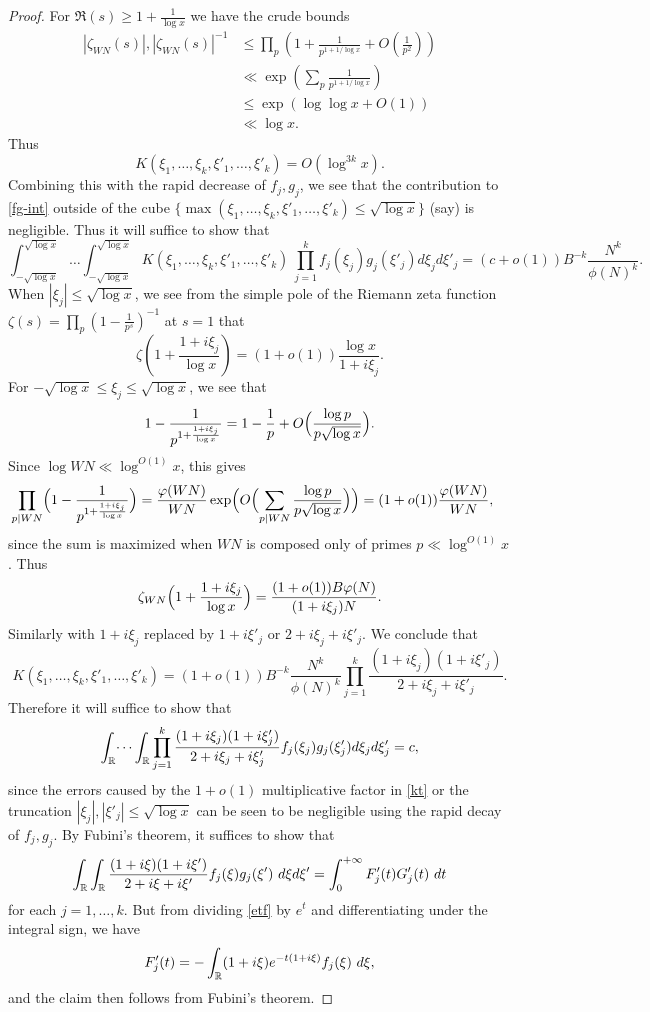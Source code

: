 \begin{proof}
For $\Re(s) \geq 1 + \frac{1}{\log x}$ we have the crude bounds
\begin{align*}
 |\zeta_{W N}(s)|, |\zeta_{W N}(s)|^{-1} &\leq \prod_p \left(1 + \frac{1}{p^{1+1/\log x}} + O\left(\frac{1}{p^2}\right)\right)\\
&\ll \exp\left( \sum_p \frac{1}{p^{1+1/\log x}} \right) \\
&\leq \exp( \log\log x + O(1) ) \\
&\ll \log x.
\end{align*}
Thus
$$
 K(\xi_1,\dots,\xi_k,\xi'_1,\dots,\xi'_k) = O( \log^{3k} x ).$$
Combining this with the rapid decrease of $f_j, g_j$, we see that the contribution to \eqref{fg-int} outside of the cube $\{\max(\xi_1,\dots,\xi_k,\xi'_1,\dots,\xi'_k) \leq \sqrt{\log x}\}$ (say) is negligible.  Thus it will suffice to show that
$$
 \int_{-\sqrt{\log x}}^{\sqrt{\log x}} \dots \int_{-\sqrt{\log x}}^{\sqrt{\log x}} K(\xi_1,\dots,\xi_k,\xi'_1,\dots,\xi'_k)\ \prod_{j=1}^k f_j(\xi_j) g_j(\xi'_j) d\xi_j d\xi'_j = (c+o(1)) B^{-k}\frac{N^k}{\phi(N)^k}.
$$
When $|\xi_j| \leq \sqrt{\log x}$, we see from the simple pole of the Riemann zeta function $\zeta(s) = \prod_p (1-\frac{1}{p^s})^{-1}$ at $s=1$ that
$$ \zeta\left(1 + \frac{1+i\xi_j}{\log x}\right) = (1+o(1)) \frac{\log x}{1+i\xi_j}.$$
For $-\sqrt{\log{x}}\le \xi_j\le \sqrt{\log{x}}$, we see that
$$ 1-\frac{1}{p^{1+\frac{1+i\xi_j}{\log{x}}}}=1-\frac{1}{p}+O\Bigl(\frac{\log{p}}{p\sqrt{\log{x}}}\Bigr).$$
Since $\log{WN}\ll \log^{O(1)}{x}$, this gives
\begin{align*}
 \prod_{p|WN} \Bigl(1 - \frac{1}{p^{1+\frac{1+i\xi_j}{\log x}}}\Bigr) &= \frac{\phi(WN)}{WN}\exp\Bigl(O\Bigl(\sum_{p|WN}\frac{\log{p}}{p\sqrt{\log{x}}}\Bigr)\Bigr) = (1+o(1))\frac{\phi(WN)}{WN},
\end{align*}
since the sum is maximized when $WN$ is composed only of primes $p\ll \log^{O(1)}{x}$. Thus
$$ \zeta_{WN}\Bigl(1 + \frac{1+i\xi_j}{\log x}\Bigr) = \frac{(1+o(1)) B \phi(N)}{(1 + i\xi_j)N}.$$
Similarly with $1+i\xi_j$ replaced by $1+i\xi'_j$ or $2+i\xi_j+i\xi'_j$.  We conclude that
\begin{equation}\label{kt}
 K(\xi_1,\dots,\xi_k,\xi'_1,\dots,\xi'_k) = (1+o(1)) B^{-k}\frac{N^k}{\phi(N)^k} \prod_{j=1}^k \frac{(1+i\xi_j) (1+i\xi'_j)}{2+i\xi_j+i\xi'_j}.
\end{equation}
Therefore it will suffice to show that
$$
 \int_\R \dots \int_\R \prod_{j=1}^k \frac{(1+i\xi_j) (1+i\xi'_j)}{2+i\xi_j+i\xi'_j}  f_j(\xi_j) g_j(\xi'_j) d\xi_j d\xi'_j
= c,$$
since the errors caused by the $1+o(1)$ multiplicative factor in \eqref{kt} or the truncation $|\xi_j|, |\xi'_j| \leq \sqrt{\log x}$ can be seen to be negligible using the rapid decay of $f_j,g_j$.  By Fubini's theorem, it suffices to show that
$$ 
\int_\R \int_\R \frac{(1+i\xi) (1+i\xi')}{2+i\xi+i\xi'} f_j(\xi) g_j(\xi')\ d\xi d\xi' = \int_0^{+\infty} F_j'(t) G_j'(t)\ dt$$
for each $j=1,\dots,k$.
But from dividing \eqref{etf} by $e^t$ and differentiating under the integral sign, we have
$$F'_j(t) = - \int_\R (1+i\xi) e^{-t(1+i\xi)} f_j(\xi)\ d\xi,$$
and the claim then follows from Fubini's theorem.


\end{proof}
